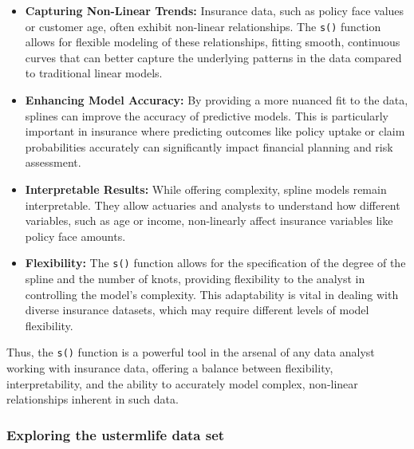 \documentclass[12pt, twoside,hidelinks]{article}
\theoremstyle{definition}
\numberwithin{equation}{section}
\begin{document}
\begin{itemize}
    \item \textbf{Capturing Non-Linear Trends:} Insurance data, such as policy face values or customer age, often exhibit non-linear relationships. The \texttt{s()} function allows for flexible modeling of these relationships, fitting smooth, continuous curves that can better capture the underlying patterns in the data compared to traditional linear models.

    \item \textbf{Enhancing Model Accuracy:} By providing a more nuanced fit to the data, splines can improve the accuracy of predictive models. This is particularly important in insurance where predicting outcomes like policy uptake or claim probabilities accurately can significantly impact financial planning and risk assessment.

    \item \textbf{Interpretable Results:} While offering complexity, spline models remain interpretable. They allow actuaries and analysts to understand how different variables, such as age or income, non-linearly affect insurance variables like policy face amounts.

    \item \textbf{Flexibility:} The \texttt{s()} function allows for the specification of the degree of the spline and the number of knots, providing flexibility to the analyst in controlling the model's complexity. This adaptability is vital in dealing with diverse insurance datasets, which may require different levels of model flexibility.
\end{itemize}

Thus, the \texttt{s()} function is a powerful tool in the arsenal of any data analyst working with insurance data, offering a balance between flexibility, interpretability, and the ability to accurately model complex, non-linear relationships inherent in such data.



\subsubsection{Exploring the \textbf{ustermlife} data set}
\end{document}
